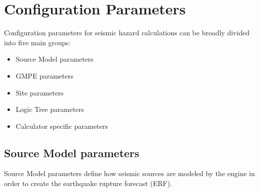 \section{Configuration Parameters}
Configuration parameters for seismic hazard calculations can be broadly divided into five main groups:
\begin{itemize}
\item Source Model parameters
\item GMPE parameters
\item Site parameters
\item Logic Tree parameters
\item Calculator specific parameters
\end{itemize}

\subsection{Source Model parameters}
Source Model parameters define how seismic sources are modeled by the engine in order to create the earthquake rupture forecast (ERF).\\

